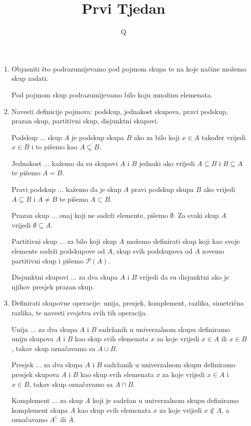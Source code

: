 \documentclass{article}
\title{\textbf{Prvi Tjedan}}
\author{Q}
\date{}
\begin{document}
\pagecolor{black}
\color{white}
\maketitle

\begin{enumerate}

\item Objasniti što podrazumijevamo pod pojmom skupa te na koje načine možemo skup zadati.

Pod pojmom skup podrazumijevamo bilo koju množinu elemenata.

\item Navesti definicije pojmova: podskup, jednakost skupova, pravi podskup, prazan skup, partitivni skup, disjunktni skupovi.

Podskup ... skup $A$ je podskup skupa $B$ ako za bilo koji $x \in A$ također vrijedi $x \in B$ i to pišemo kao $A \subseteq B$.

Jednakost ... kažemo da su skupovi $A$ i $B$ jednaki ako vrijedi $A\subseteq B$ i $B\subseteq A$ te pišemo $A=B$.

Pravi podskup ... kažemo da je skup $A$ pravi podskup skupa $B$ ako vrijedi $A\subseteq B$ i $A\neq B$ te pišemo $A\subset B$.

Prazan skup ... onaj koji ne sadrži elemente, pišemo $\emptyset$. Za svaki skup $A$ vrijedi $\emptyset\subseteq A$.

Partitivni skup ... za bilo koji skup $A$ možemo definirati skup koji kao svoje elemente sadrži podskupove od $A$, skup svih podskupova od $A$ zovemo partitivni skup i pišemo $\mathcal{P}(A)$.

Disjunktni skupovi ... za dva skupa $A$ i $B$ vrijedi da su disjunktni ako je njihov presjek prazan skup.

\item Definirati skupovne operacije: unija, presjek, komplement, razlika, simetrična razlika, te navesti svojstva svih tih operacija.

Unija ... za dva skupa $A$ i $B$ sadržanih u univerzalnom skupu definiramo uniju skupova $A$ i $B$ kao skup svih elemenata $x$ za koje vrijedi $x\in A$ ili $x\in B$, takav skup označavamo sa $A\cup B$.

Presjek ... za dva skupa $A$ i $B$ sadržanih u univerzalnom skupu definiramo presjek skupova $A$ i $B$ kao skup svih elemenata $x$ za koje vrijedi $x\in A$ i $x\in B$, takav skup označavamo sa $A\cap B$.

Komplement ... za skup $A$ koji je sadržan u univerzalnom skupu definiramo komplement skupa $A$ kao skup svih elemenata $x$ za koje vrijedi $x\notin A$, a označavamo ${A}^\complement$ ili $\overline{A}$.


\end{enumerate}
\end{document}
